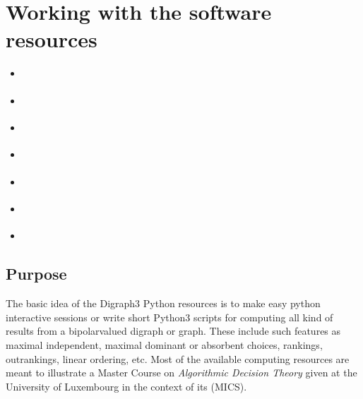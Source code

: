 \documentclass[a4paper,12pt,english]{sphinxhowto}
\begin{document}
\section{Working with the  software resources}
\label{\detokenize{tutorial:working-with-the-digraph3-software-resources}}\label{\detokenize{tutorial:digraphs-tutorial-label}}
\begin{sphinxShadowBox}
\begin{itemize}
\item {} 
\label{\detokenize{tutorial:id157}}{\hyperref[\detokenize{tutorial:purpose}]{}}

\item {} 
\label{\detokenize{tutorial:id158}}{\hyperref[\detokenize{tutorial:downloading-of-the-digraph3-resources}]{}}

\item {} 
\label{\detokenize{tutorial:id159}}{\hyperref[\detokenize{tutorial:starting-a-python3-session}]{}}

\item {} 
\label{\detokenize{tutorial:id160}}{\hyperref[\detokenize{tutorial:digraph-object-structure}]{}}

\item {} 
\label{\detokenize{tutorial:id161}}{\hyperref[\detokenize{tutorial:permanent-storage}]{}}

\item {} 
\label{\detokenize{tutorial:id162}}{\hyperref[\detokenize{tutorial:inspecting-a-digraph-object}]{}}

\item {} 
\label{\detokenize{tutorial:id163}}{\hyperref[\detokenize{tutorial:special-classes}]{}}

\end{itemize}
\end{sphinxShadowBox}


\subsection{Purpose}
\label{\detokenize{tutorial:purpose}}
The basic idea of the Digraph3 Python resources is to make easy python interactive sessions or write short Python3 scripts for computing all kind of results from a bipolar\sphinxhyphen{}valued digraph or graph. These include such features as maximal independent, maximal dominant or absorbent choices, rankings, outrankings, linear ordering, etc. Most of the available computing resources are meant to illustrate a Master Course  on \emph{Algorithmic Decision Theory} given at the University of Luxembourg in the context of its  (MICS).
\end{document}
